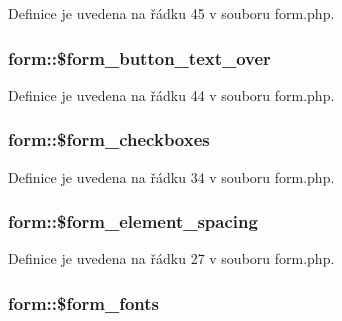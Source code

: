 Definice je uvedena na řádku 45 v souboru form.\-php.

\hypertarget{classform_ab6c6802c6ae2eb929943a0f590d007ee}{
\subsubsection[{\$form\-\_\-button\-\_\-text\-\_\-over}]{\setlength{\rightskip}{0pt plus 5cm}form\-::\$form\-\_\-button\-\_\-text\-\_\-over}}\label{classform_ab6c6802c6ae2eb929943a0f590d007ee}


Definice je uvedena na řádku 44 v souboru form.\-php.

\hypertarget{classform_ada7e815926ed805332ab2abb6c5faa6b}{
\subsubsection[{\$form\-\_\-checkboxes}]{\setlength{\rightskip}{0pt plus 5cm}form\-::\$form\-\_\-checkboxes}}\label{classform_ada7e815926ed805332ab2abb6c5faa6b}


Definice je uvedena na řádku 34 v souboru form.\-php.

\hypertarget{classform_a7bc6e7cebca5418b43e712e813022227}{
\subsubsection[{\$form\-\_\-element\-\_\-spacing}]{\setlength{\rightskip}{0pt plus 5cm}form\-::\$form\-\_\-element\-\_\-spacing}}\label{classform_a7bc6e7cebca5418b43e712e813022227}


Definice je uvedena na řádku 27 v souboru form.\-php.

\hypertarget{classform_a6bc82fbec76a214fc5779614d6041a7f}{
\subsubsection[{\$form\-\_\-fonts}]{\setlength{\rightskip}{0pt plus 5cm}form\-::\$form\-\_\-fonts}}\label{classform_a6bc82fbec76a214fc5779614d6041a7f}


